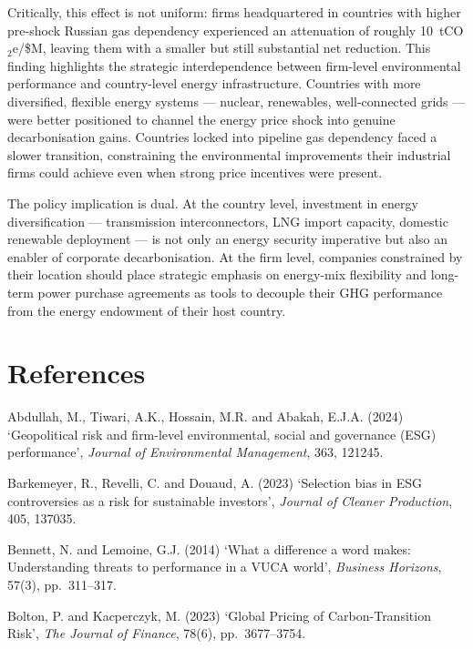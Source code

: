 \documentclass[authoryear,preprint,review,12pt]{elsarticle}
\begin{document}
Critically, this effect is not uniform: firms headquartered in countries with higher pre-shock Russian gas dependency experienced an attenuation of roughly 10~tCO$_2$e/\$M, leaving them with a smaller but still substantial net reduction. This finding highlights the strategic interdependence between firm-level environmental performance and country-level energy infrastructure. Countries with more diversified, flexible energy systems --- nuclear, renewables, well-connected grids --- were better positioned to channel the energy price shock into genuine decarbonisation gains. Countries locked into pipeline gas dependency faced a slower transition, constraining the environmental improvements their industrial firms could achieve even when strong price incentives were present.

The policy implication is dual. At the country level, investment in energy diversification --- transmission interconnectors, LNG import capacity, domestic renewable deployment --- is not only an energy security imperative but also an enabler of corporate decarbonisation. At the firm level, companies constrained by their location should place strategic emphasis on energy-mix flexibility and long-term power purchase agreements as tools to decouple their GHG performance from the energy endowment of their host country.

\section*{References}

\setlength{\parindent}{0pt}

Abdullah, M., Tiwari, A.K., Hossain, M.R. and Abakah, E.J.A. (2024) `Geopolitical risk and firm-level environmental, social and governance (ESG) performance', \textit{Journal of Environmental Management}, 363, 121245.

Barkemeyer, R., Revelli, C. and Douaud, A. (2023) `Selection bias in ESG controversies as a risk for sustainable investors', \textit{Journal of Cleaner Production}, 405, 137035.

Bennett, N. and Lemoine, G.J. (2014) `What a difference a word makes: Understanding threats to performance in a VUCA world', \textit{Business Horizons}, 57(3), pp.\ 311--317.

Bolton, P. and Kacperczyk, M. (2023) `Global Pricing of Carbon-Transition Risk', \textit{The Journal of Finance}, 78(6), pp.\ 3677--3754.
\end{document}

